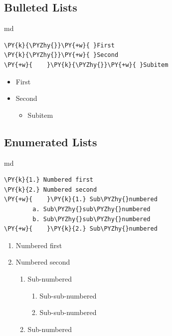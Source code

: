 \documentclass[a4paper,twoside]{article}
\begin{document}
\subsection{Bulleted Lists}\label{bulleted-lists}

\begin{code}{md}{}{}
\begin{Verbatim}[commandchars=\\\{\},breaklines, breakanywhere, commandchars=\\\{\}]
\PY{k}{\PYZhy{}}\PY{+w}{ }First
\PY{k}{\PYZhy{}}\PY{+w}{ }Second
\PY{+w}{    }\PY{k}{\PYZhy{}}\PY{+w}{ }Subitem
\end{Verbatim}
\end{code}
\begin{displayquote}

\begin{itemize}
\item{} First
\item{} Second
\begin{itemize}
\item{} Subitem

\end{itemize}

\end{itemize}

\end{displayquote}
\subsection{Enumerated Lists}\label{enumerated-lists}

\begin{code}{md}{}{}
\begin{Verbatim}[commandchars=\\\{\},breaklines, breakanywhere, commandchars=\\\{\}]
\PY{k}{1.} Numbered first
\PY{k}{2.} Numbered second
\PY{+w}{    }\PY{k}{1.} Sub\PYZhy{}numbered
        a. Sub\PYZhy{}sub\PYZhy{}numbered
        b. Sub\PYZhy{}sub\PYZhy{}numbered
\PY{+w}{    }\PY{k}{2.} Sub\PYZhy{}numbered
\end{Verbatim}
\end{code}
\begin{displayquote}

\begin{enumerate}
\item Numbered first
\item Numbered second
\begin{enumerate}
\item Sub-numbered
\begin{enumerate}
\item Sub-sub-numbered
\item Sub-sub-numbered

\end{enumerate}
\item Sub-numbered

\end{enumerate}

\end{enumerate}

\end{displayquote}
\end{document}
